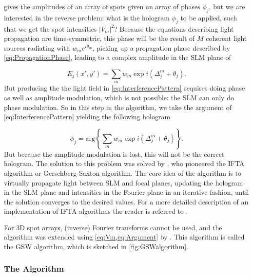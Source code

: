  gives the amplitudes of an array of spots given an array of phases $\phi_j$, but we are interested in the reverse problem: what is the hologram $\phi_j$ to be applied, such that we get the spot intensities $|V_m|^2$? 
Because the equations describing light propagation are time-symmetric, this phase will be the result of $M$ coherent light sources radiating with $w_m e^{i \theta_m}$, picking up a propagation phase described by \cref{eq:PropagationPhase}, leading to a complex amplitude in the \ac{SLM} plane of \cite{DiLeonardo2007,Leseleuc2018}

\begin{equation}\label{eq:InterferencePattern}
    E_j (x',y') = \sum_m w_m \exp{
    i\left(\Delta_j^m + \theta_j\right)
    }.
\end{equation}
But producing the the light field in \cref{eq:InterferencePattern} requires doing phase as well as amplitude modulation, which is not possible: the SLM can only do phase modulation.
So in this step in the algorithm, we take the argument of  \cref{eq:InterferencePattern} yielding the following hologram

\begin{equation}\label{eq:Argument}
    \phi_j = \text{arg}\left\{
     \sum_m w_m \exp{
    i\left(\Delta_j^m + \theta_j\right)
    }
    \right\}.
\end{equation}
But because the amplitude modulation is lost, this will not be the correct hologram.
The solution to this problem was solved by \cite{Gerschberg1972}, who pioneered the \ac{IFTA} algorithm or Gerschberg-Saxton algorithm.
The core idea of the algorithm is to virtually propagate light between SLM and focal planes, updating the hologram in the SLM plane and  intensities in the Fourier plane in an iterative fashion, until the solution converges to the desired values.
For a more detailed description of an implementation of IFTA algorithms the reader is referred to \cite{Bijnen2013,Bijnen2015}.

For 3D spot arrays, (inverse) Fourier transforms cannot be used, and the algorithm was extended using \cref{eq:Vm,eq:Argument} by \cite{DiLeonardo2007}. 
This algorithm is called the \ac{GSW} algorithm, which is sketched in \cref{fig:GSWalgorithm}.

\subsubsection*{The Algorithm}

